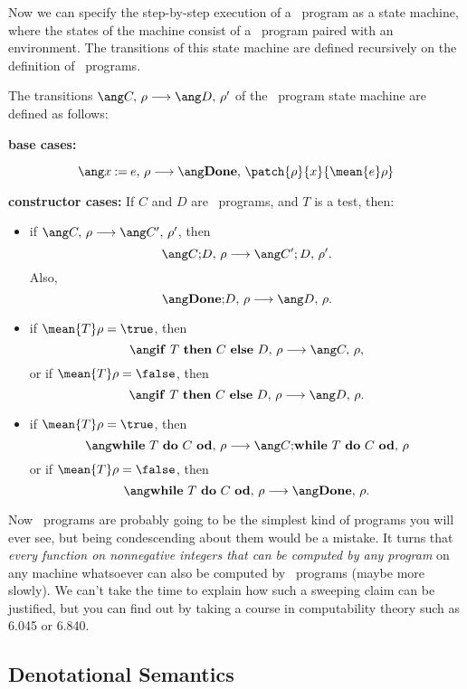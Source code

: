 Now we can specify the step-by-step execution of a \while\ program as a state
machine, where the states of the machine consist of a \while\ program paired with an
environment.  The transitions of this state machine are defined
recursively on the definition of \while\ programs.

\begin{definition}

The transitions $\step{C}{\rho}{D}{\rho'}$ of the \while\ program state machine are
defined as follows:

\textbf{base cases:}

\[
\step{x \assigned e}{\rho}{\halt}{\patch{\rho}{x}{\mean{e}\rho}}
\]

\textbf{constructor cases:}
If $C$ and $D$ are \while\ programs, and $T$ is a test, then:

\begin{itemize}

\item if $\step{C}{\rho}{C'}{\rho'}$, then
\[
\step{\seqcomm{C}{D}}{\rho}{C';D}{\rho'}.
\]
Also,
\[
\step{\seqcomm{\halt}{D}}{\rho}{D}{\rho}.
\]

\item if $\mean{T}\rho = \true$, then
\[
\step{\condcomm{T}{C}{D}}{\rho}{C}{\rho},
\]
or if $\mean{T}\rho = \false$, then
\[
\step{\condcomm{T}{C}{D}}{\rho}{D}{\rho}.
\]

\item if $\mean{T}\rho = \true$, then
\[
\step{\wloop{T}{C}}{\rho}{\seqcomm{C}{\wloop{T}{C}}}{\rho}
\]
or if $\mean{T}\rho = \false$, then
\[
\step{\wloop{T}{C}}{\rho}{\halt}{\rho}.
\]
\end{itemize}
\end{definition}

Now \while\ programs are probably going to be the simplest kind of programs you will
ever see, but being condescending about them would be a mistake.  It turns
that \emph{every function on nonnegative integers that can be computed by
  any program} on any machine whatsoever can also be computed by \while\ programs
(maybe more slowly).  We can't take the time to explain how such a
sweeping claim can be justified, but you can find out by taking a course
in computability theory such as 6.045 or 6.840.

\subsection{Denotational Semantics}

